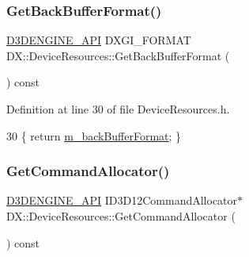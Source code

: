 \mbox{\label{class_d_x_1_1_device_resources_aca67f798cb4669d889a24e48b1b53acc}} 
\subsubsection{\texorpdfstring{Get\+Back\+Buffer\+Format()}{GetBackBufferFormat()}}
{\footnotesize\ttfamily \mbox{\hyperlink{stdafx_8h_a8ee2d990c5dfba7794dd2b60741d7722}{D3\+D\+E\+N\+G\+I\+N\+E\+\_\+\+A\+PI}} D\+X\+G\+I\+\_\+\+F\+O\+R\+M\+AT D\+X\+::\+Device\+Resources\+::\+Get\+Back\+Buffer\+Format (\begin{DoxyParamCaption}{ }\end{DoxyParamCaption}) const\hspace{0.3cm}{\ttfamily [inline]}}



Definition at line 30 of file Device\+Resources.\+h.


\begin{DoxyCode}
30 \{ \textcolor{keywordflow}{return} \mbox{\hyperlink{class_d_x_1_1_device_resources_a9f23666e062bdebe694eb2dd7e454cba}{m\_backBufferFormat}}; \}
\end{DoxyCode}
\mbox{\label{class_d_x_1_1_device_resources_a416ba6505eff4048099366721ec9fc1d}} 
\subsubsection{\texorpdfstring{Get\+Command\+Allocator()}{GetCommandAllocator()}}
{\footnotesize\ttfamily \mbox{\hyperlink{stdafx_8h_a8ee2d990c5dfba7794dd2b60741d7722}{D3\+D\+E\+N\+G\+I\+N\+E\+\_\+\+A\+PI}} I\+D3\+D12\+Command\+Allocator$\ast$ D\+X\+::\+Device\+Resources\+::\+Get\+Command\+Allocator (\begin{DoxyParamCaption}{ }\end{DoxyParamCaption}) const\hspace{0.3cm}{\ttfamily [inline]}}



